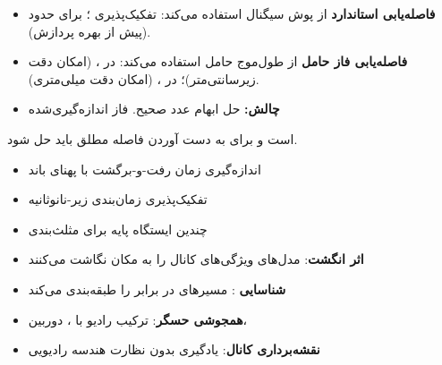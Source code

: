 

\CNchained{}

\begin{itemize}
\tightlist
\item
  \textbf{فاصله‌یابی استاندارد} از پوش سیگنال استفاده می‌کند: تفکیک‌پذیری ؛ برای  حدود  (پیش از بهره پردازش).
\item
  \textbf{فاصله‌یابی فاز حامل} از طول‌موج حامل \lr{$\lambda$} استفاده می‌کند: در ،  (امکان دقت زیرسانتی‌متر)؛ در ،  (امکان دقت میلی‌متری).
\item
  \textbf{چالش:} حل ابهام عدد صحیح. فاز اندازه‌گیری‌شده
\end{itemize}


است و برای به دست آوردن فاصله مطلق باید  حل شود.


\begin{itemize}
\tightlist
\item
  اندازه‌گیری زمان رفت-و-برگشت با پهنای باند 
\item
  تفکیک‌پذیری زمان‌بندی زیر-نانوثانیه
\item
  چندین ایستگاه پایه برای مثلث‌بندی
\end{itemize}


\begin{itemize}
\tightlist
\item
  \textbf{اثر انگشت}: مدل‌های  ویژگی‌های کانال را به مکان نگاشت می‌کنند
\item
  \textbf{شناسایی }:  مسیرهای  در برابر  را طبقه‌بندی می‌کند
\item
  \textbf{همجوشی حسگر}: ترکیب رادیو با ، دوربین، 
\item
  \textbf{نقشه‌برداری کانال}: یادگیری بدون نظارت هندسه رادیویی
\end{itemize}


